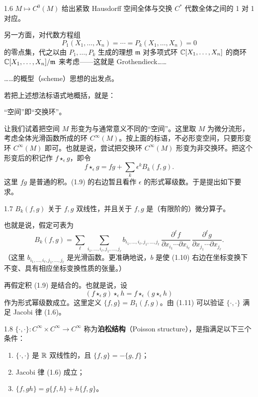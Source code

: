 \begin{theorem}{1.6}
  $M\mapsto C^0(M)$ 给出紧致 Hausdorff 空间全体与交换 $C^*$ 代数全体之间的 1 对 1 对应。
\end{theorem}

另一方面，对代数方程组
\[
  P_1(X_1,\dots,X_n)=\cdots=P_k(X_1,\dots,X_n)=0
\]
的零点集，代之以由 $P_1,\dots,P_k$ 生成的理想 $\mathfrak{m}$ 对多项式环 $\mathbb{C}[X_1,\dots,X_n]$ 的商环 $\mathbb{C}[X_1,\dots,X_n]/\mathfrak{m}$ 来考虑——这就是 Grothendieck……

……的概型（scheme）思想的出发点。

若把上述想法标语式地概括，就是：
\begin{center}
“空间”即“交换环”。
\end{center}
让我们试着把空间 $M$ 形变为与通常意义不同的“空间”。这里取 $M$ 为微分流形，考虑全体光滑函数所成的环 $C^\infty(M)$。按上面的标语，不必形变空间，只要形变环 $C^\infty(M)$ 即可。也就是说，尝试把交换环 $C^\infty(M)$ 形变为非交换环。把这个形变后的积记作 $f\star_\epsilon g$，即令
\begin{equation}
  f\star_\epsilon g=fg+\sum_k \epsilon^k B_k(f,g). \tag{1.9}
\end{equation}
这里 $fg$ 是普通的积。(1.9) 的右边暂且看作 $\epsilon$ 的形式幂级数。于是提出如下要求。

\begin{assumption}{1.7}
  $B_k(f,g)$ 关于 $f,g$ 双线性，并且关于 $f,g$ 是（有限阶的）微分算子。
\end{assumption}

也就是说，假定可表为
\begin{equation}
  B_k(f,g)=\sum_\ell\sum_{i_1,\dots,i_\ell,j_1,\dots,j_\ell}
  b_{i_1,\dots,i_\ell,j_1,\dots,j_\ell}\,
  \frac{\partial^\ell f}{\partial x_{i_1}\cdots\partial x_{i_\ell}}\,
  \frac{\partial^\ell g}{\partial x_{j_1}\cdots\partial x_{j_\ell}}. \tag{1.10}
\end{equation}
（这里 $b_{i_1,\dots,i_\ell,j_1,\dots,j_\ell}$ 是光滑函数。更准确地说，$b$ 是使 (1.10) 右边在坐标变换下不变、具有相应坐标变换性质的张量。）

再假定积 (1.9) 是结合的。也就是说，设
\begin{equation}
  (f\star_\epsilon g)\star_\epsilon h=f\star_\epsilon(g\star_\epsilon h) \tag{1.11}
\end{equation}
作为形式幂级数成立。这里定义 $\{f,g\}=B_1(f,g)$。由 (1.11) 可以验证 $\{\cdot,\cdot\}$ 满足 Jacobi 律 (1.6)。

\begin{definition}{1.8}
  $\{\cdot,\cdot\}\colon C^\infty\times C^\infty\to C^\infty$ 称为\textbf{泊松结构}（Poisson structure），是指满足以下三个条件：
  \begin{enumerate}[label=(\arabic*),leftmargin=2.4em,itemsep=1pt,topsep=2pt]
    \item $\{\cdot,\cdot\}$ 是 $\mathbb{R}$ 双线性的，且 $\{f,g\}=-\{g,f\}$；
    \item Jacobi 律 (1.6) 成立；
    \item $\{f,gh\}=g\{f,h\}+h\{f,g\}$。
  \end{enumerate}
\end{definition}

